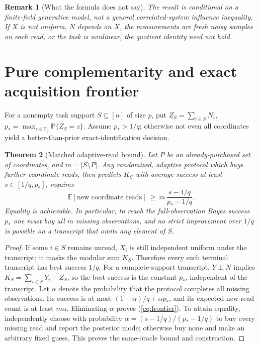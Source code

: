 \documentclass[11pt,letterpaper]{article}
\newtheorem{theorem}{Theorem}
\newtheorem{remark}[theorem]{Remark}
\newcommand{\F}{\mathbb F}
\newcommand{\Prb}{\mathbb P}
\newcommand{\E}{\mathbb E}
\begin{document}
\begin{remark}[What the formula does not say]
The result is conditional on a finite-field generative model, \emph{not} a general correlated-system influence inequality. If \(X\) is not uniform, \(N\) depends on \(X\), the measurements are fresh noisy samples on each read, or the task is nonlinear, the quotient identity need not hold.
\end{remark}

\section{Pure complementarity and exact acquisition frontier}
For a nonempty task support \(S\subseteq[n]\) of size \(p\), put \(Z_S=\sum_{i\in S}N_i\), \(p_*=\max_{z\in\F_q}\Prb\{Z_S=z\}\). Assume \(p_*>1/q\); otherwise not even all coordinates yield a better-than-prior exact-identification decision.

\begin{theorem}[Matched adaptive-read bound]\label{thm:frontier}
Let \(P\) be an already-purchased set of coordinates, and \(m=|S\setminus P|\). Any randomized, adaptive protocol which buys further coordinate reads, then predicts \(K_S\) with average success at least \(s\in[1/q,p_*]\), requires
\begin{equation}\label{eq:frontier}
\E[\text{new coordinate reads}]\ \geq\ m\,\frac{s-1/q}{p_*-1/q}.
\end{equation}
Equality is achievable. In particular, to reach the full-observation Bayes success \(p_*\) one must buy all \(m\) missing observations, and no strict improvement over \(1/q\) is possible on a transcript that omits any element of \(S\).
\end{theorem}

\begin{proof}
If some \(i\in S\) remains unread, \(X_i\) is still independent uniform under the transcript; it masks the modular sum \(K_S\). Therefore every such terminal transcript has best success \(1/q\). For a complete-support transcript, \(Y\perp N\) implies \(K_S=\sum_{i\in S}Y_i-Z_S\), so the best success is the constant \(p_*\), independent of the transcript. Let \(\alpha\) denote the probability that the protocol completes all missing observations. Its success is at most \((1-\alpha)/q+\alpha p_*\), and its expected new-read count is at least \(m\alpha\). Eliminating \(\alpha\) proves (\ref{eq:frontier}). To attain equality, independently choose with probability \(\alpha=(s-1/q)/(p_*-1/q)\) to buy every missing read and report the posterior mode; otherwise buy none and make an arbitrary fixed guess. This proves the same-oracle bound and construction.
\end{proof}
\end{document}
